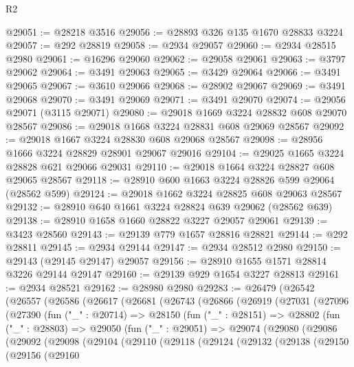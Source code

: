 \begin{lexlean}{R2}
\begin{coremodule}
@29051 := @28218 @3516
@29056 := @28893 @326 @135 @1670 @28833 @3224
@29057 := @292 @28819
@29058 := @2934 @29057
@29060 := @2934 @28515 @2980
@29061 := @16296 @29060
@29062 := @29058 @29061
@29063 := @3797 @29062
@29064 := @3491 @29063
@29065 := @3429 @29064
@29066 := @3491 @29065
@29067 := @3610 @29066
@29068 := @28902 @29067
@29069 := @3491 @29068
@29070 := @3491 @29069
@29071 := @3491 @29070
@29074 := @29056 @29071 (@3115 @29071)
@29080 := @29018 @1669 @3224 @28832 @608 @29070 @28567
@29086 := @29018 @1668 @3224 @28831 @608 @29069 @28567
@29092 := @29018 @1667 @3224 @28830 @608 @29068 @28567
@29098 := @28956 @1666 @3224 @28829 @28901 @29067 @29016
@29104 := @29025 @1665 @3224 @28828 @621 @29066 @29031
@29110 := @29018 @1664 @3224 @28827 @608 @29065 @28567
@29118 := @28910 @600 @1663 @3224 @28826 @599 @29064 (@28562 @599)
@29124 := @29018 @1662 @3224 @28825 @608 @29063 @28567
@29132 := @28910 @640 @1661 @3224 @28824 @639 @29062 (@28562 @639)
@29138 := @28910 @1658 @1660 @28822 @3227 @29057 @29061
@29139 := @3423 @28560
@29143 := @29139 @779 @1657 @28816 @28821
@29144 := @292 @28811
@29145 := @2934 @29144
@29147 := @2934 @28512 @2980
@29150 := @29143 (@29145 @29147) @29057
@29156 := @28910 @1655 @1571 @28814 @3226 @29144 @29147
@29160 := @29139 @929 @1654 @3227 @28813
@29161 := @2934 @28521
@29162 := @28980 @2980
@29283 := @26479
    (@26542
      (@26557
        (@26586
          (@26617
            (@26681
              (@26743
                (@26866
                  (@26919
                    (@27031
                      (@27096
                        (@27390
                          (fun ("_" : @20714) =>
                          @28150
                            (fun ("_" : @28151) =>
                            @28802
                              (fun ("_" : @28803) =>
                              @29050
                                (fun ("_" : @29051) =>
                                @29074
                                  (@29080
                                    (@29086
                                      (@29092
                                        (@29098
                                          (@29104
                                            (@29110
                                              (@29118
                                                (@29124
                                                  (@29132
                                                    (@29138
                                                      (@29150
                                                        (@29156
                                                          (@29160

\end{coremodule}
\end{lexlean}
